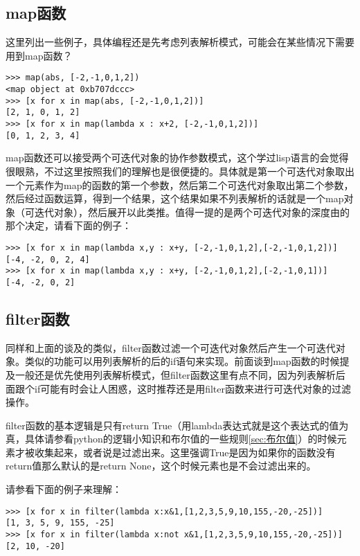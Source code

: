 \documentclass[12pt,oneside]{book}
\begin{document}
\begin{common-format}
\subsection{map函数}
这里列出一些例子，具体编程还是先考虑列表解析模式，可能会在某些情况下需要用到map函数？

\begin{Verbatim}
>>> map(abs, [-2,-1,0,1,2])
<map object at 0xb707dccc>
>>> [x for x in map(abs, [-2,-1,0,1,2])]
[2, 1, 0, 1, 2]
>>> [x for x in map(lambda x : x+2, [-2,-1,0,1,2])]
[0, 1, 2, 3, 4]
\end{Verbatim}


map函数还可以接受两个可迭代对象的协作参数模式，这个学过lisp语言的会觉得很眼熟，不过这里按照我们的理解也是很便捷的。具体就是第一个可迭代对象取出一个元素作为map的函数的第一个参数，然后第二个可迭代对象取出第二个参数，然后经过函数运算，得到一个结果，这个结果如果不列表解析的话就是一个map对象（可迭代对象），然后展开以此类推。值得一提的是两个可迭代对象的深度由的那个决定，请看下面的例子：
\begin{Verbatim}
>>> [x for x in map(lambda x,y : x+y, [-2,-1,0,1,2],[-2,-1,0,1,2])]
[-4, -2, 0, 2, 4]
>>> [x for x in map(lambda x,y : x+y, [-2,-1,0,1,2],[-2,-1,0,1])]
[-4, -2, 0, 2]
\end{Verbatim}

\subsection{filter函数}
同样和上面的谈及的类似，filter函数过滤一个可迭代对象然后产生一个可迭代对象。类似的功能可以用列表解析的后的if语句来实现。前面谈到map函数的时候提及一般还是优先使用列表解析模式，但filter函数这里有点不同，因为列表解析后面跟个if可能有时会让人困惑，这时推荐还是用filter函数来进行可迭代对象的过滤操作。

filter函数的基本逻辑是只有return True（用lambda表达式就是这个表达式的值为真，具体请参看python的逻辑小知识和布尔值的一些规则\ref{sec:布尔值}）的时候元素才被收集起来，或者说是过滤出来。这里强调True是因为如果你的函数没有return值那么默认的是return None，这个时候元素也是不会过滤出来的。

请参看下面的例子来理解：
\begin{Verbatim}
>>> [x for x in filter(lambda x:x&1,[1,2,3,5,9,10,155,-20,-25])]
[1, 3, 5, 9, 155, -25]
>>> [x for x in filter(lambda x:not x&1,[1,2,3,5,9,10,155,-20,-25])]
[2, 10, -20]
\end{Verbatim}



\end{common-format}
\end{document}
